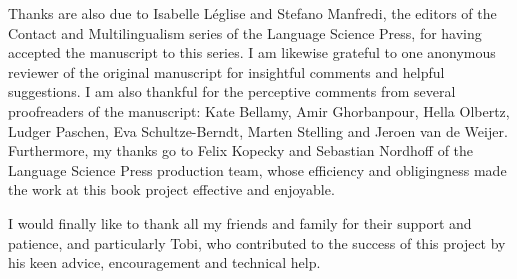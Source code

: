 Thanks are also due to Isabelle Léglise and Stefano Manfredi, the editors of the Contact and Multilingualism  series of the Language Science Press, for having accepted the manuscript to this series. I am likewise grateful to one anonymous reviewer of the original manuscript for insightful comments and helpful suggestions. I am also thankful for the perceptive comments from several proofreaders of the manuscript: Kate Bellamy, Amir Ghorbanpour, Hella Olbertz, Ludger Paschen, Eva Schultze-Berndt, Marten Stelling and Jeroen van de Weijer. Furthermore, my thanks go to Felix Kopecky and Sebastian Nordhoff of the Language Science Press production team, whose efficiency and obligingness made the work at this book project effective and enjoyable.

I would finally like to thank all my friends and family for their support and patience, and particularly Tobi, who contributed to the success of this project by his keen advice, encouragement and technical help.
